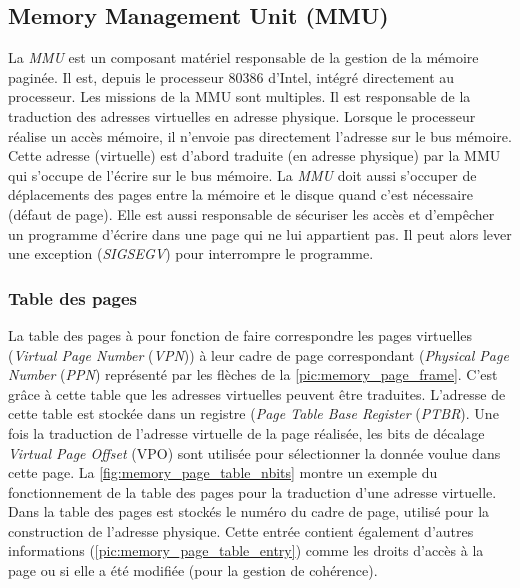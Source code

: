\subsection{Memory Management Unit (MMU)} \label{sec:mmu}
La \textit{MMU} est un composant matériel responsable de la gestion de la mémoire paginée. Il est, depuis le processeur 80386 d'Intel, intégré directement au processeur. Les missions de la MMU sont multiples. Il est responsable de la traduction des adresses virtuelles en adresse physique. Lorsque le processeur réalise un accès mémoire, il n'envoie pas directement l'adresse sur le bus mémoire. Cette adresse (virtuelle) est d'abord traduite (en adresse physique) par la MMU qui s'occupe de l'écrire sur le bus mémoire. La \textit{MMU} doit aussi s'occuper de déplacements des pages entre la mémoire et le disque quand c'est nécessaire (défaut de page). Elle est aussi responsable de sécuriser les accès et d'empêcher un programme d'écrire dans une page qui ne lui appartient pas. Il peut alors lever une exception (\textit{SIGSEGV}) pour interrompre le programme. 

\subsubsection{Table des pages} \label{sec:table_page}
La table des pages à pour fonction de faire correspondre les pages virtuelles (\textit{Virtual Page Number} (\textit{VPN})) à leur cadre de page correspondant (\textit{Physical Page Number} (\textit{PPN}) représenté par les flèches de la \autoref{pic:memory_page_frame}. C'est grâce à cette table que les adresses virtuelles peuvent être traduites. L'adresse de cette table est stockée dans un registre (\textit{Page Table Base Register} (\textit{PTBR}). Une fois la traduction de l'adresse virtuelle de la page réalisée, les bits de décalage \textit{Virtual Page Offset} (VPO) sont utilisée pour sélectionner la donnée voulue dans cette page. La \autoref{fig:memory_page_table_nbits} montre un exemple du fonctionnement de la table des pages pour la traduction d'une adresse virtuelle. Dans la table des pages est stockés le numéro du cadre de page, utilisé pour la construction de l'adresse physique. Cette entrée contient également d'autres informations (\autoref{pic:memory_page_table_entry}) comme les droits d'accès à la page ou si elle a été modifiée (pour la gestion de cohérence).

